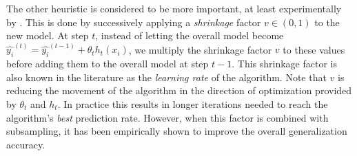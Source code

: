 \documentclass{article}%
\theoremstyle{definition}
\begin{document}
The other heuristic is considered to be more important, at least experimentally by \cite{hastie-elemstatslearn}. This is done by successively applying a \textit{shrinkage} factor $v \in  (0,1)$ to the new model.  At step $t$, instead of letting the overall model become $ \hat{y_i}^{(t)} = \hat{y_i}^{(t-1)} +  \theta_t h_t(x_i) $, we multiply the shrinkage factor $v$ to these values before adding them to the overall model at step $t-1$. This shrinkage factor is also known in the literature as the \textit{learning rate} of the algorithm.  Note that $v$  is reducing the movement of the algorithm in the direction of optimization provided by $\theta_t$ and $h_t$. In practice this results in longer iterations needed to reach the algorithm's \textit{best} prediction rate. However, when this factor is combined with subsampling, it has been empirically shown to improve the overall generalization accuracy.
\end{document}
